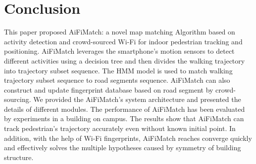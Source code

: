 \documentclass{llncs}
\begin{document}
%
%
%
%
%
%

\section{Conclusion}

This paper proposed AiFiMatch: a novel map matching Algorithm based on activity detection and crowd-sourced Wi-Fi for indoor pedestrian tracking and positioning. AiFiMatch leverages the smartphone's motion sensors to detect different activities using a decision tree and then divides the walking trajectory into trajectory subset sequence. The HMM model is used to match walking trajectory subset sequence to road segments sequence.  AiFiMatch can also construct and update fingerprint database based on road segment by crowd-sourcing. We provided the AiFiMatch's system architecture and presented the details of different modules. The performance of AiFiMatch has been evaluated by experiments in a building on campus. The results show that AiFiMatch can track pedestrian's trajectory accurately even without known initial point. In addition, with the help of Wi-Fi fingerprints, AiFiMatch reaches converge quickly and effectively solves the multiple hypotheses caused by symmetry of building structure. 

%
%
%


\end{document}

